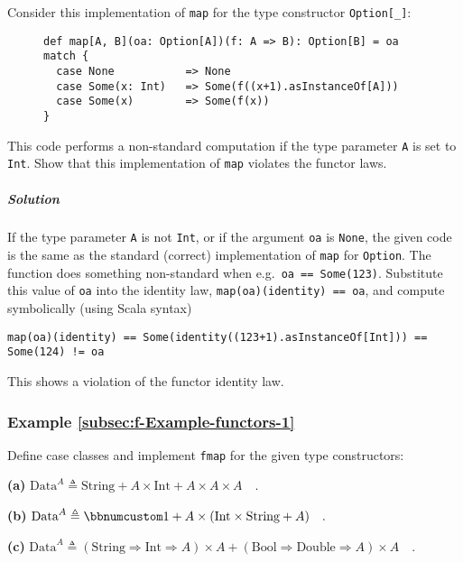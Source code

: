Consider this implementation of \lstinline!map! for the type constructor
\lstinline!Option[_]!:

\begin{wrapfigure}{l}{0.66\columnwidth}%
\vspace{-0.8\baselineskip}
\begin{lstlisting}
def map[A, B](oa: Option[A])(f: A => B): Option[B] = oa match {
  case None           => None
  case Some(x: Int)   => Some(f((x+1).asInstanceOf[A]))
  case Some(x)        => Some(f(x))
}
\end{lstlisting}

\vspace{-1\baselineskip}
\end{wrapfigure}%

\noindent This code performs a non-standard computation if the type
parameter \lstinline!A! is set to \lstinline!Int!. Show that this
implementation of \lstinline!map! violates the functor laws.

\subparagraph{Solution}

If the type parameter \lstinline!A! is not \lstinline!Int!, or if
the argument \lstinline!oa! is \lstinline!None!, the given code
is the same as the standard (correct) implementation of \lstinline!map!
for \lstinline!Option!. The function does something non-standard
when e.g.~\lstinline!oa == Some(123)!. Substitute this value of
\lstinline!oa! into the identity law, \lstinline!map(oa)(identity) == oa!,
and compute symbolically (using Scala syntax)
\begin{lstlisting}
map(oa)(identity) == Some(identity((123+1).asInstanceOf[Int])) == Some(124) != oa
\end{lstlisting}
This shows a violation of the functor identity law.

\subsubsection{Example \label{subsec:f-Example-functors-1}\ref{subsec:f-Example-functors-1}}

Define case classes and implement \lstinline!fmap! for the given
type constructors:

\textbf{(a)} $\text{Data}^{A}\triangleq\text{String}+A\times\text{Int}+A\times A\times A\quad.$

\textbf{(b)} $\text{Data}^{A}\triangleq\bbnum 1+A\times(\text{Int}\times\text{String}+A)\quad.$

\textbf{(c)} $\text{Data}^{A}\triangleq(\text{String}\Rightarrow\text{Int}\Rightarrow A)\times A+(\text{Bool}\Rightarrow\text{Double}\Rightarrow A)\times A\quad.$

